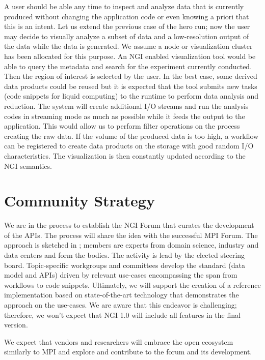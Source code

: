 \documentclass[a4paper, twocolumn]{article}
\begin{document}
A user should be able any time to inspect and analyze data that is currently produced without changing the application code or even knowing a priori that this is an intent.
Let us extend the previous case of the hero run; now the user may decide to visually analyze a subset of data and a low-resolution output of the data while the data is generated.
We assume a node or visualization cluster has been allocated for this purpose.
An NGI enabled visualization tool would be able to query the metadata and search for the experiment currently conducted.
Then the region of interest is selected by the user.
In the best case, some derived data products could be reused but it is expected that the tool submits new tasks (code snippets for liquid computing) to the runtime to perform data analysis and reduction.
The system will create additional I/O streams and run the analysis codes in streaming mode as much as possible while it feeds the output to the application.
This would allow us to perform filter operations on the process creating the raw data.
If the volume of the produced data is too high, a workflow can be registered to create data products on the storage with good random I/O characteristics.
The visualization is then constantly updated according to the NGI semantics.



\section{Community Strategy}

We are in the process to establish the NGI Forum that curates the development of the APIs.
The process will share the idea with the successful MPI Forum.
The approach is sketched in ;
members are experts from domain science, industry and data centers and form the bodies.
The activity is lead by the elected steering board.
Topic-specific workgroups and committees develop the standard (data model and APIs) driven by relevant use-cases encompassing the span from workflows to code snippets.
Ultimately, we will support the creation of a reference implementation based on state-of-the-art technology that demonstrates the approach on the use-cases.
We are aware that this endeavor is challenging; therefore, we won't expect that NGI 1.0 will include all features in the final version.

We expect that vendors and researchers will embrace the open ecosystem similarly to MPI and explore and contribute to the forum and its development.
\end{document}
